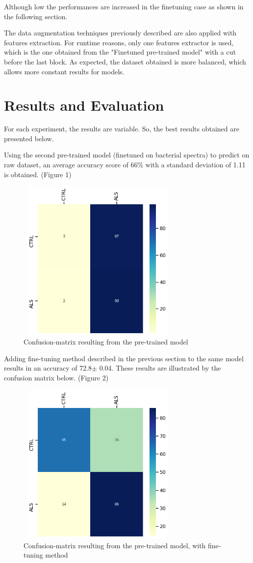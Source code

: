 Although low the performances are increased  in the finetuning case as shown in the following section.

The data augmentation techniques previously described are also applied with features extraction. For runtime reasons, only one features extractor is used, which is the one obtained from the "Finetuned pre-trained model" with a cut before the last block.
As expected, the dataset obtained is more balanced, which allows more constant results for models.

\section{Results and Evaluation}
For each experiment, the results are variable. So, the best results obtained are presented below.

Using the second pre-trained model (finetuned on bacterial spectra) to predict on raw dataset, an average accuracy score of 66\% with a standard deviation of 1.11 is obtained. (Figure 1)
\begin{figure}[H]
\centering
\caption{Confusion-matrix resulting from the pre-trained model}
\includegraphics[width=8cm, height=8cm]{raw_model_results}
\end{figure}

Adding fine-tuning method described in the previous section to the same model results in an accuracy of 72.8$\pm$ 0.04. These results are illustrated by the confusion matrix below. (Figure 2)
\begin{figure}[H]
\centering
\caption{Confusion-matrix resulting from the pre-trained model, with fine-tuning method}
\includegraphics[width=8cm, height=8cm]{finetuning_model_results}
\end{figure}


